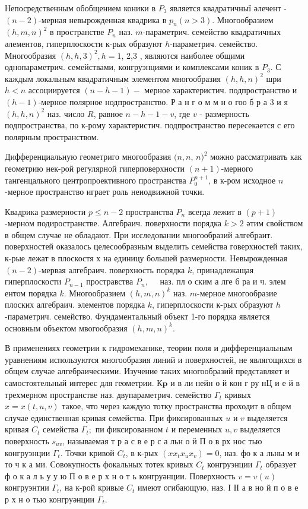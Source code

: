 \documentclass[10pt]{article}
\begin{document}
Непосредственным обобщением коники в $P_{3}$ является квадратичныї әлечент - $(n-2)$-мерная невырожденная квадрика в $p_{n}(n>3)$. Многообразием $(h, m, n)^{2}$ в пространстве $P_{n}$ наз. $m$-параметрич. семейство квадратичных әлементов, гиперплоскости к-рых образуют $h$-параметрич. семейство. Многообразия $(h, h, 3)^{2}, h=1$, 2,3 , являются наиболее общими однопараметрич. семействами, конгруэнциями и комплексами коник в $P_{3}$. С каждым локальным квадратичным элементом многообразия $(h, h, n)^{2}$ шри $h<n$ ассоциируется $(n-h-1)-$ мерное характеристич. подпространство и $(h-1)$-мерное полярное нодпространство. Р а н г о м м н о гоо б р а 3 и я $(h, h, n)^{2}$ наз. число $R$, равное $n-h-1-v$, где $v$ - размерность подпространства, по к-рому характеристич. подпространство пересекается с его полярным пространством.



Дифференциальную геометриго многообразия $(n, n$, $n)^{2}$ можно рассматривать как геометрию нек-рой регулярной гиперповерхности $(n+1)$-мерного тангенцального центропроективного пространства $P_{0}^{n+1}$, в к-ром исходное $n$-мерное пространство играет роль неиодвижной точки.



Квадрика размерности $p \leqslant n-2$ пространства $P_{n}$ всегда лежит в $(p+1)$-мерном подиространстве. Алгебраич. поверхности порядка $k>2$ әтим свойством в общем случае не обладают. При исследовании многообразий алгебраит. поверхностей оказалось целесообразным выделить семейства говерхностей таких, к-рые лежат в плоскостя х на единицу большей размерности. Невырожденная $(n-2)$-мервая алгебраич. поверхность порядка $k$, принадлежащая гиперплоскости $P_{n-1}$ простравства $P_{n}, \quad$ наз. пл о ским а лге б ра и ч. элем ентом порядка $k$. Многообразием $(h, m, n)^{k}$ наз. $m$-мерное многообразие плоских алгебраич. элементов порядка $k$, гиперплоскости к-рых образуют $h$-параметрич. семейство. Фундаментальный объект 1-го порядка является основным объектом мвогообразия $(h, m, n)^{k}$.



В применениях геометрии к гидромеханике, теории поля и дифференциальным уравнениям используются многообразия линий и поверхностей, не являгощихся в общем случае алгебраическими. Изучение таких многообразий представляет и самостоятельный интерес для геометрии. $К \mathbf{p}$ и в ли нейн о й кон г ру нЦ и е й в трехмерном пространстве наз. двупараметрич. семейство $\Gamma_{t}$ кривых $x=x(t, u, v)$ такое, что через каждую тотку пространства проходит в общем случае единственная кривая семейства. При фиксированных $u$ и $v$ выделяется кривая $C_{t}$ семейства $\Gamma_{t} ;$ пи фиксированном $t$ и переменных $u, v$ выделяется поверхность $s_{u v}$, называемая т р а с в е р с а льн о ӥ П о в рх нос тью конгруэнции $\Gamma_{t}$. Точки кривой $C_{t}$, в к-рых $\left(x x_{t} x_{u} x_{v}\right)=0$, наз. фо к а льны м и то ч к а ми. Совокупность фокальных тотек кривых $C_{t}$ конгруэнции $\Gamma_{t}$ образует ф о к а л ь у у ю П о в е р х н о т ь конгруәнции. Поверхность $v=v(u)$ конгруэнтии $\Gamma_{t}$, на к-рой кривые $C_{t}$ имеют огибающую, наз. І ІІ а в но й п о в е р х н о тью конгруәнции $\Gamma_{t}$.
\end{document}
